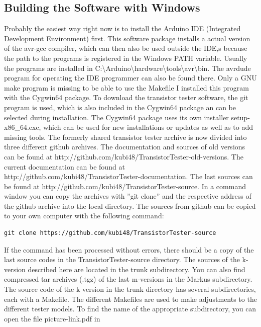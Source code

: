 \newpage
\subsection{Building the Software with Windows}
Probably the easiest way right now is to install the Arduino IDE (Integrated Development Environment) first.
This software package installs a actual version of the avr-gcc compiler, which can then also be used outside the IDE,s
because the path to the programs is registered in the Windows PATH variable. 
Usually the programs are installed in C:\textbackslash Arduino\textbackslash hardware\textbackslash tools\textbackslash avr\textbackslash bin.
The avrdude program for operating the IDE programmer can also be found there.
Only a GNU make program is missing to be able to use the Makefile
I installed this program with the Cygwin64 package.
To download the transistor tester software, the git program is used, which is also included in the Cygwin64 package an
can be selected during installation. 
The Cygwin64 package uses its own installer setup-x86\_64.exe, which can be used for new installations or updates as well as
to add missing tools.
The formerly shared transistor tester archive is now divided into three different github archives.
The documentation and sources of old versions can be found at http://github.com/kubi48/TransistorTester-old-versions.
The current documentation can be found at http://github.com/kubi48/TransistorTester-documentation.
The last sources can be found at http://github.com/kubi48/TransistorTester-source.
In a command window you can copy the archives with ''git clone'' and the respective address of the github archive into the local directory.
The sources from github can be copied to your own computer with the following command:
\begin{verbatim}
git clone https://github.com/kubi48/TransistorTester-source
\end{verbatim}
If the command has been processed without errors, there should be a copy of the last source codes
in the TransistorTester-source directory. 
The sources of the k-version described here are located in the trunk subdirectory.
You can also find compressed tar archives (.tgz) of the last m-versions in the Markus subdirectory.\\
The source code of the k version in the trunk directory has several subdirectories, each with a Makefile.
The different Makefiles are used to make adjustments to the different tester models.
To find the name of the appropriate subdirectory, you can open the file picture-link.pdf in
